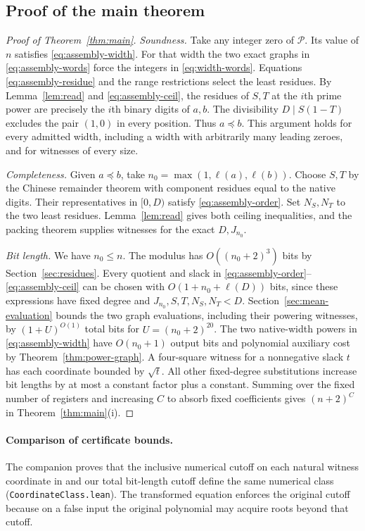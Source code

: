 \documentclass[11pt,letterpaper]{article}
\numberwithin{equation}{section}
\begin{document}
\subsection{Proof of the main theorem}
\begin{proof}[Proof of Theorem~\ref{thm:main}]
\emph{Soundness.} Take any integer zero of $\mathcal P$. Its value of $n$ satisfies \eqref{eq:assembly-width}. For that width the two exact graphs in \eqref{eq:assembly-words} force the integers in \eqref{eq:width-words}. Equations \eqref{eq:assembly-residue} and the range restrictions select the least residues. By Lemma~\ref{lem:read} and \eqref{eq:assembly-ceil}, the residues of $S,T$ at the $i$th prime power are precisely the $i$th binary digits of $a,b$. The divisibility $D\mid S(1-T)$ excludes the pair $(1,0)$ in every position. Thus $a\preceq b$. This argument holds for every admitted width, including a width with arbitrarily many leading zeroes, and for witnesses of every size.

\emph{Completeness.} Given $a\preceq b$, take $n_0=\max(1,\ell(a),\ell(b))$. Choose $S,T$ by the Chinese remainder theorem with component residues equal to the native digits. Their representatives in $[0,D)$ satisfy \eqref{eq:assembly-order}. Set $N_S,N_T$ to the two least residues. Lemma~\ref{lem:read} gives both ceiling inequalities, and the packing theorem supplies witnesses for the exact $D,J_{n_0}$.

\emph{Bit length.} We have $n_0\le n$. The modulus has $O((n_0+2)^3)$ bits by Section~\ref{sec:residues}. Every quotient and slack in \eqref{eq:assembly-order}--\eqref{eq:assembly-ceil} can be chosen with $O(1+n_0+\ell(D))$ bits, since these expressions have fixed degree and $J_{n_0},S,T,N_S,N_T<D$. Section~\ref{sec:mean-evaluation} bounds the two graph evaluations, including their powering witnesses, by $(1+U)^{O(1)}$ total bits for $U=(n_0+2)^{20}$. The two native-width powers in \eqref{eq:assembly-width} have $O(n_0+1)$ output bits and polynomial auxiliary cost by Theorem~\ref{thm:power-graph}. A four-square witness for a nonnegative slack $t$ has each coordinate bounded by $\sqrt t$. All other fixed-degree substitutions increase bit lengths by at most a constant factor plus a constant. Summing over the fixed number of registers and increasing $C$ to absorb fixed coefficients gives $(n+2)^C$ in Theorem~\ref{thm:main}(i).
\end{proof}
\paragraph{Comparison of certificate bounds.}
The companion proves that the inclusive numerical cutoff on each natural witness coordinate in \cite{pollett} and our total bit-length cutoff define the same numerical class (\texttt{CoordinateClass.lean}). The transformed equation enforces the original cutoff because on a false input the original polynomial may acquire roots beyond that cutoff.
\end{document}
